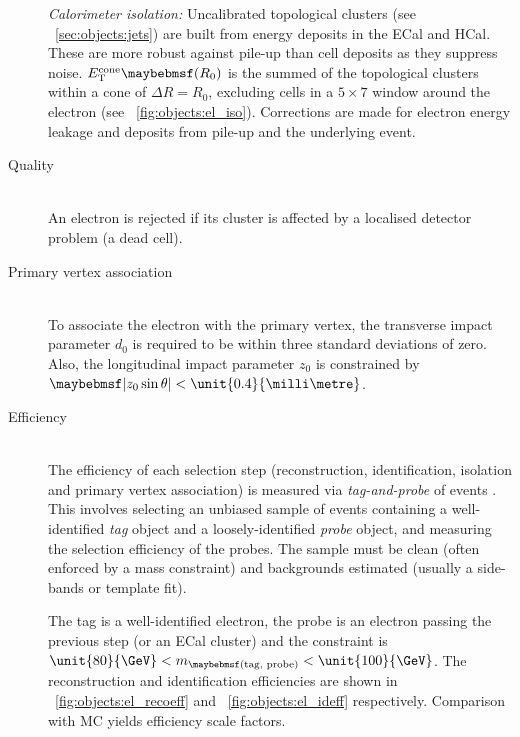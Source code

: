 \begin{description}
	\textit{Calorimeter isolation:} Uncalibrated topological clusters (see 
	\Section~\ref{sec:objects:jets}) are built from energy deposits in the \ac{ECal} 
	and \ac{HCal}. These are more robust against pile-up than cell deposits as they 
	suppress noise. $E_{\text{T}}^{\text{cone}}\parenths{R_0}$ is the summed \et of the 
	topological clusters within a cone of $\Delta R = R_0$, excluding cells in a 
	$5 \times 7$ window around the electron (see \Figure~\ref{fig:objects:el_iso}). 
	Corrections are made for electron energy leakage and deposits from pile-up and the 
	underlying event.
\item[Quality] \hfill \\
	An electron is rejected if its cluster is affected by a localised detector problem 
	(\eg a dead cell).
\item[Primary vertex association] \hfill \\
	To associate the electron with the primary vertex, the transverse impact parameter 
	$d_0$ is required to be within three standard deviations of zero. Also, the 
	longitudinal impact parameter $z_0$ is constrained by $\mods{z_0 \sin\theta} < 
	\unit{0.4}{\milli\metre}$.
\item[Efficiency] \hfill \\
	The efficiency of each selection step (reconstruction, identification, isolation and 
	primary vertex association) is measured via \textit{tag-and-probe} of 
	\HepProcess{\PZ \HepTo \Pe\Pe} events \cite{ElectronPerf:2010,ElectronPerf:2012}. 
	This involves selecting an unbiased sample of events containing a well-identified 
	\textit{tag} object and a loosely-identified \textit{probe} object, and measuring the 
	selection efficiency of the probes. The sample must be clean (often enforced by a 
	mass constraint) and backgrounds estimated (usually a side-bands or template fit).

	The tag is a well-identified electron, the probe is an electron passing the previous 
	step (or an \ac{ECal} cluster) and the constraint is $\unit{80}{\GeV} < 
	m_{\parenths{\text{tag, probe}}} < \unit{100}{\GeV}$. The reconstruction and 
	identification efficiencies are shown in \Figure~\ref{fig:objects:el_recoeff} and 
	\Figure~\ref{fig:objects:el_ideff} respectively. Comparison with MC yields efficiency 
	scale factors.
\end{description}

